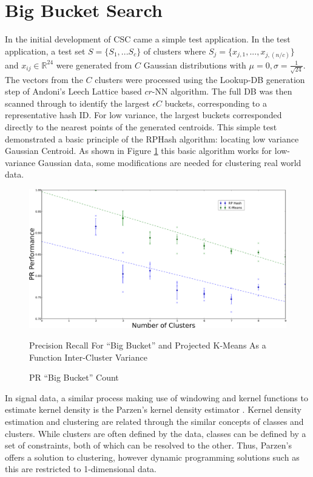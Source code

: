 \section{Big Bucket Search}

In the initial development of CSC came a simple test application.  In the test application, a test set
$S=\{S_1,...S_c\}$ of clusters where $S_j = \{x_{j,1},...,x_{j,(n/c)}\}$ and $x_{ij}\in \mathbb{R}^{24}$ were generated
from $C$ Gaussian distributions with $\mu=0,\sigma=\frac{1}{\sqrt{24}} $.  The vectors from the $C$ clusters were
processed using the Lookup-DB generation step of Andoni's \cite{Andoni} Leech Lattice based $cr$-NN algorithm. The full
DB was then scanned through to identify the largest $\epsilon C$ buckets, corresponding to a representative hash ID.
For low variance, the largest buckets corresponded directly to the nearest points of the generated centroids.  This
simple test demonstrated a basic principle of the \textsf{RPHash} algorithm: locating low variance Gaussian Centroid.  As shown
in Figure \ref{bbvar} this basic algorithm works for low-variance Gaussian data, some modifications are needed for
clustering real world data.

\begin{figure}
  \centerline{\includegraphics[width=.8\textwidth]{figs/PRvaryClusters}}
  \caption{PR ``Big Bucket'' Count}{Precision Recall For ``Big Bucket'' and Projected K-Means As a Function Inter-Cluster Variance }\label{bbvar}
\end{figure}

In signal data, a similar process making use of windowing and kernel functions to estimate kernel density is the
Parzen's kernel density estimator \cite{parzen-62}.  Kernel density estimation and clustering are related through the similar concepts of
classes and clusters. While clusters are often defined by the data, classes can be defined by a set of constraints,
both of which can be resolved to the other.  Thus, Parzen's offers a solution to clustering, however dynamic programming
solutions such as this are restricted to 1-dimensional data.

